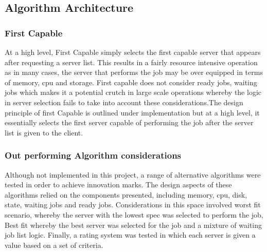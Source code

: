 \subsection{Algorithm Architecture}
\subsubsection{First Capable}
At a high level, First Capable simply selects the first capable server that appears after requesting a server list. This results in a fairly resource intensive operation as in many cases, the server that performs the job may be over equipped in terms of memory, cpu and storage. First capable does not consider ready jobs, waiting jobs which makes it a potential crutch in large scale operations whereby the logic in server selection fails to take into account these considerations.The design principle of first Capable is outlined under implementation but at a high level, it essentially selects the first server capable of performing the job after the server list is given to the client.

\subsubsection{Out performing Algorithm considerations}
Although not implemented in this project, a range of alternative algorithms were tested in order to achieve innovation marks. The design aspects of these algorithms relied on the components presented, including memory, cpu, disk, state, waiting jobs and ready jobs. Considerations in this space involved worst fit scenario, whereby the server with the lowest spec was selected to perform the job, Best fit whereby the best server was selected for the job and a mixture of waiting job list logic. Finally, a rating system was tested in which each server is given a value based on a set of criteria. 
